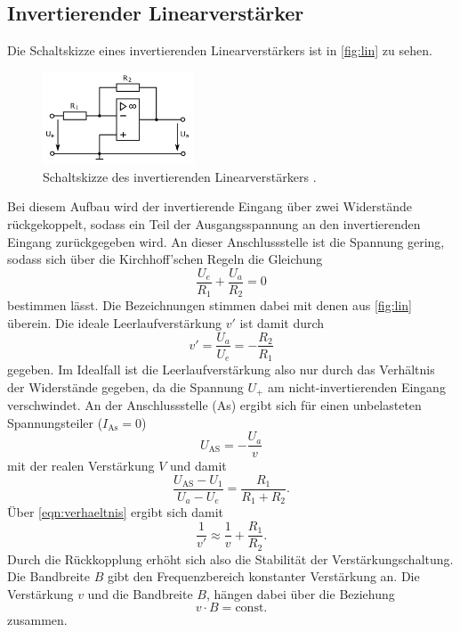 \subsection{Invertierender Linearverstärker}
Die Schaltskizze eines invertierenden Linearverstärkers ist in \autoref{fig:lin} zu sehen.
\begin{figure}[H]
    \centering
    \includegraphics[width=0.4\textwidth]{linear.png}
    \caption{Schaltskizze des invertierenden Linearverstärkers \cite{anleitung}.}
    \label{fig:lin}
\end{figure}
Bei diesem Aufbau wird der invertierende Eingang über zwei Widerstände rückgekoppelt,
sodass ein Teil der 
Ausgangsspannung an den invertierenden Eingang zurückgegeben wird. An dieser Anschlussstelle 
ist die Spannung gering, sodass sich über die Kirchhoff'schen Regeln die Gleichung 
\begin{equation*}
    \frac{U_e}{R_1} + \frac{U_a}{R_2} = 0
\end{equation*}
bestimmen lässt. Die Bezeichnungen stimmen dabei mit denen aus \autoref{fig:lin} überein.
Die ideale Leerlaufverstärkung $v'$ ist damit durch 
\begin{equation}
    \label{eqn:verhaeltnis}
    v' = \frac{U_a}{U_e} = - \frac{R_2}{R_1}
\end{equation}
gegeben. Im Idealfall ist die Leerlaufverstärkung also nur durch das Verhältnis der Widerstände
gegeben, da die Spannung $U_+$ am nicht-invertierenden Eingang verschwindet.
An der Anschlussstelle (As) ergibt sich für einen unbelasteten Spannungsteiler ($I_\text{As}=0$)
\begin{equation*}
    U_\text{AS} = - \frac{U_a}{v}
\end{equation*}
mit der realen Verstärkung $V$ und damit 
\begin{equation*}
    \frac{U_\text{AS} - U_1}{U_a - U_e} = \frac{R_1}{R_1 + R_2}.
\end{equation*}   
Über \autoref{eqn:verhaeltnis} ergibt sich damit
\begin{equation*}
    \frac{1}{v'} \approx \frac{1}{v} + \frac{R_1}{R_2}.
\end{equation*}
Durch die Rückkopplung erhöht sich also die Stabilität der Verstärkungschaltung.
Die Bandbreite $B$ gibt den Frequenzbereich konstanter Verstärkung an.
Die Verstärkung $v$ und die Bandbreite $B$, hängen dabei über die Beziehung
\begin{equation*}
    v \cdot B = \text{const.}
\end{equation*}
zusammen.
